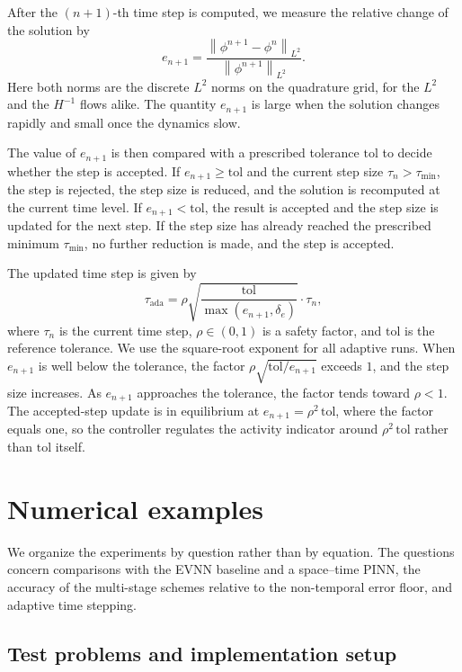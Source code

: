 \documentclass[11pt,letterpaper]{article}
\theoremstyle{plain}
\theoremstyle{definition}
\newcommand{\norm}[1]{\left\| #1 \right\|}
\begin{document}
After the $(n+1)$-th time step is computed, we measure the relative change of the solution by
\begin{equation}
e_{n+1} = \frac{\norm{\phi^{n+1} - \phi^{n}}_{L^2}}{\norm{\phi^{n+1}}_{L^2}}.
\end{equation}
Here both norms are the discrete $L^2$ norms on the quadrature grid, for the $L^2$ and the $H^{-1}$ flows alike. The quantity $e_{n+1}$ is large when the solution changes rapidly and small once the dynamics slow.

The value of $e_{n+1}$ is then compared with a prescribed tolerance $\mathrm{tol}$ to decide whether the step is accepted. If $e_{n+1} \ge \mathrm{tol}$ and the current step size $\tau_n > \tau_{\min}$, the step is rejected, the step size is reduced, and the solution is recomputed at the current time level. If $e_{n+1} < \mathrm{tol}$, the result is accepted and the step size is updated for the next step. If the step size has already reached the prescribed minimum $\tau_{\min}$, no further reduction is made, and the step is accepted.

The updated time step is given by
   \begin{equation}
\tau_{\mathrm{ada}} = \rho \sqrt{\frac{\mathrm{tol}}{\max(e_{n+1},\delta_e)}} \cdot \tau_{n},
\label{eq:tau_ada}
\end{equation}
where $\tau_{n}$ is the current time step, $\rho\in(0,1)$ is a safety factor, and $\mathrm{tol}$ is the reference tolerance. We use the square-root exponent for all adaptive runs. When $e_{n+1}$ is well below the tolerance, the factor $\rho\sqrt{\mathrm{tol}/e_{n+1}}$ exceeds $1$, and the step size increases. As $e_{n+1}$ approaches the tolerance, the factor tends toward $\rho < 1$. The accepted-step update is in equilibrium at $e_{n+1}=\rho^2\,\mathrm{tol}$, where the factor equals one, so the controller regulates the activity indicator around $\rho^2\,\mathrm{tol}$ rather than $\mathrm{tol}$ itself.


\section{Numerical examples}
\label{sec:numerics}

We organize the experiments by question rather than by equation. The questions concern comparisons with the EVNN baseline and a space--time PINN, the accuracy of the multi-stage schemes relative to the non-temporal error floor, and adaptive time stepping.

\subsection{Test problems and implementation setup}
\end{document}

